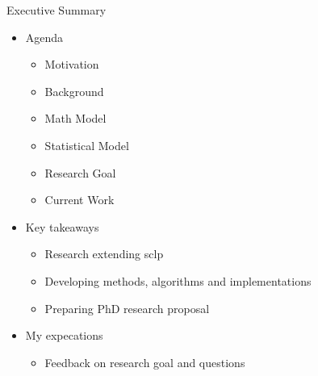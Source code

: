 \documentclass[pdf]{beamer}
\theoremstyle{definition}
\begin{document}
\begin{frame}{Executive Summary}
    \begin{itemize}
        \item Agenda
        \begin{itemize}
            \item Motivation
            \item Background
            \item Math Model
            \item Statistical Model
            \item Research Goal
            \item Current Work
        \end{itemize}

        \item Key takeaways
        \begin{itemize}
            \item Research extending \acrshort{sclp}
            \item Developing methods, algorithms and implementations
            \item Preparing PhD research proposal
        \end{itemize}

        \item My expecations
        \begin{itemize}
            \item Feedback on research goal and questions
        \end{itemize}
    \end{itemize}
\end{frame}

\end{document}
